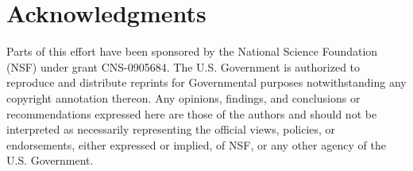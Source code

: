 \section*{Acknowledgments}\label{acks}

Parts of this effort have been sponsored by the National Science Foundation (NSF) under grant CNS-0905684.
The U.S. Government is authorized to reproduce and distribute reprints for Governmental purposes notwithstanding any copyright annotation thereon.
Any opinions, findings, and conclusions or recommendations expressed here are those of the authors and should not be interpreted as necessarily representing the official views, policies, or endorsements, either expressed or implied, of NSF, or any other agency of the U.S. Government.





